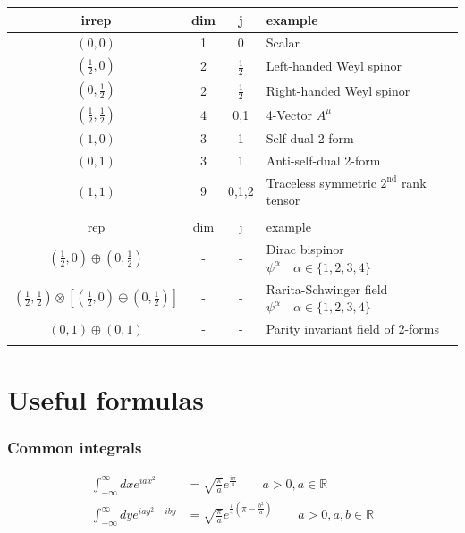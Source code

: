 \documentclass[10pt,a4paper]{article}
\theoremstyle{definition}
\begin{document}
\begin{center}
 \begin{tabular}{c c c l} 
 \hline
 irrep & dim & j & example \\ [0.5ex] 
 \hline\hline
 $(0,0)$                        & 1 & 0 & Scalar \\  [0.5ex]
 $(\frac{1}{2},0)$              & 2 & $\frac{1}{2}$ & Left-handed Weyl spinor \\  [0.5ex]
 $(0,\frac{1}{2})$              & 2 & $\frac{1}{2}$ & Right-handed Weyl spinor \\  [0.5ex]
 $(\frac{1}{2},\frac{1}{2})$    & 4 & 0,1 & 4-Vector $A^\mu$ \\  [0.5ex]
 $(1,0)$                        & 3 & 1 & Self-dual 2-form \\  [0.5ex]
 $(0,1)$                        & 3 & 1 & Anti-self-dual 2-form \\  [0.5ex]
 $(1,1)$                        & 9 & 0,1,2 & Traceless symmetric $2^\text{nd}$ rank tensor \\ \hline  \\ [0.5ex]
  \hline
 rep & dim & j & example \\ [0.5ex] 
 \hline\hline
 $(\frac{1}{2},0)\oplus(0,\frac{1}{2})$& - & - & Dirac bispinor $\psi^\alpha\quad \alpha\in\{1,2,3,4\}$ \\  [0.5ex]
 $(\frac{1}{2},\frac{1}{2})\otimes\left[(\frac{1}{2},0)\oplus(0,\frac{1}{2})\right]$& - & - & Rarita-Schwinger field $\psi^\alpha\quad \alpha\in\{1,2,3,4\}$ \\  [0.5ex]
  $(0,1)\oplus(0,1)$& - & - & Parity invariant field of 2-forms\\ \hline \\ [0.5ex]
\end{tabular}
\end{center}



\newpage
\section{Useful formulas}
\subsubsection{Common integrals}
\begin{align}
    \int_{-\infty}^\infty dx e^{iax^2}&=\sqrt{\frac{\pi}{a}}e^{\frac{i\pi}{4}} \qquad a>0, a\in\mathbb{R}\\
    \int_{-\infty}^\infty dy e^{iay^2-iby}&=\sqrt{\frac{\pi}{a}}e^{\frac{i}{4}\left(\pi-\frac{b^2}{a}\right)} \qquad a>0, a,b\in\mathbb{R}
\end{align}
\end{document}
